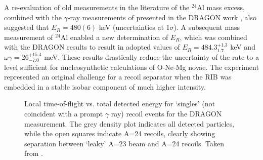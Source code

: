 A re-evaluation of old measurements in the literature of the $^{24}$Al mass excess, combined with the $\gamma$-ray measurements of \cite{lot08} presented in the DRAGON work \cite{eri10}, also suggested that $E_{R}=480(6)$ keV (uncertainties at 1$\sigma$).     
A subsequent mass measurement \cite{wre10} of $^{24}$Al enabled a new determination of $E_{R}$, which was combined with the DRAGON results to result in adopted values of $E_{R}=484.3^{+1.3}_{1.7}$ keV and $\omega\gamma=26^{+15.4}_{-7.0}$ meV.
These results drastically reduce the uncertainty of the  rate to a level sufficient for nucleosynthetic calculations of O-Ne-Mg novae. The experiment represented an original challenge for a recoil separator when the RIB was embedded in a stable isobar component of much higher intensity. 

\begin{figure}
\begin{center}
\caption{Local time-of-flight vs. total detected energy for `singles' (not coincident with a prompt $\gamma$ ray) recoil events for the DRAGON  measurement. The grey density plot indicates all detected particles, while the open squares indicate A=24 recoils, clearly showing separation between `leaky' A=23 beam and A=24 recoils. Taken from \cite{eri10}.}
\label{fig:Mg23_tof_IC}
\end{center}
\end{figure}

